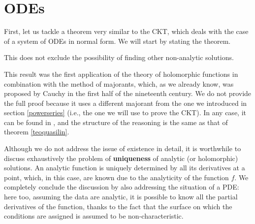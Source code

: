 \newpage
\section{ODEs}

First, let us tackle a theorem very similar to the CKT, which deals with the case of a system of ODEs in normal form. 
We will start by stating the theorem.

\begin{theorem}\label{teoedo}
{
}
\end{theorem}

\begin{remark}
This does not exclude the possibility of finding other non-analytic solutions.
\end{remark}

This result was the first application of the theory of holomorphic functions in combination with the method of majorants, which, as we already know, was proposed by Cauchy in the first half of the nineteenth century. 
We do not provide the full proof because it uses a different majorant from the one we introduced in section \ref{powerseries} (i.e., the one we will use to prove the CKT). 
In any case, it can be found in \cite{Delf}, and the structure of the reasoning is the same as that of theorem \ref{teoquasilin}.

Although we do not address the issue of existence in detail, it is worthwhile to discuss exhaustively the problem of \textbf{uniqueness} of analytic (or holomorphic) solutions. An analytic function is uniquely determined by all its derivatives at a point, which, in this case, are known due to the analyticity of the function $f$.
We completely conclude the discussion by also addressing the situation of a PDE: here too, assuming the data are analytic, it is possible to know all the partial derivatives of the function, thanks to the fact that the surface on which the conditions are assigned is assumed to be non-characteristic.


